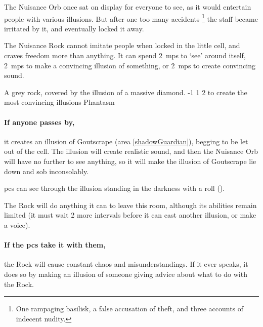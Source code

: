 \begin{multicols}{2}
\begin{exampletext}
  The Nuisance Orb once sat on display for everyone to see, as it would entertain people with various illusions.
  But after one too many accidents%
  \footnote{One rampaging basilisk, a false accusation of theft, and three accounts of indecent nudity.}
  the staff became irritated by it, and eventually locked it away.
\end{exampletext}

The Nuisance Rock cannot imitate people when locked in the little cell, and craves freedom more than anything.
It can spend 2~\glspl{mp} to `see' around itself, 2~\glspl{mp} to make a convincing illusion of something, or 2~\glspl{mp} to create convincing sound.

  {A grey rock, covered by the illusion of a massive diamond.}%
  {-1}%
  {1}%
  {2}%
  {to create the most convincing illusions}%
  {Phantasm}%
  {
    \setcounter{Fire}{3}
    \setcounter{Earth}{2}
    \setcounter{Fate}{1}
    \setcounter{Water}{1}
    \setcounter{Academics}{2}
    \setcounter{Wyldcrafting}{1}
  }%

\showStdSpells[
  \setcounter{diceNo}{0}
]

\paragraph{If anyone passes by,}
it creates an illusion of Goutscrape (area \vref{shadowGuardian}), begging to be let out of the cell.
The illusion will create realistic sound, and then the Nuisance Orb will have no further  to see anything, so it will make the illusion of Goutscrape lie down and sob inconsolably.

\Glspl{pc} can see through the illusion standing in the darkness with a  roll
(\tn[12]).

The Rock will do anything it can to leave this room, although its abilities remain limited (it must wait 2 more \glspl{interval} before it can cast another illusion, or make a voice).

\paragraph{If the \glspl{pc} take it with them,}
the Rock will cause constant chaos and misunderstandings.
If it ever speaks, it does so by making an illusion of someone giving advice about what to do with the Rock.

\end{multicols}

